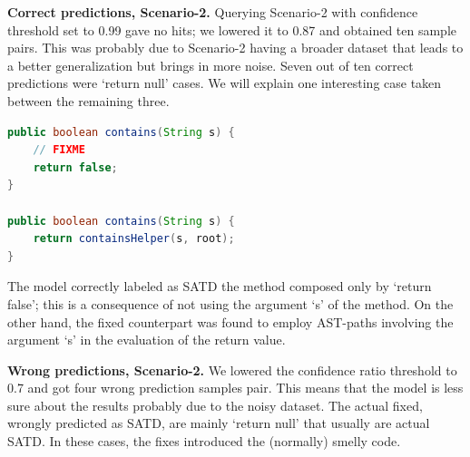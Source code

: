 \textbf{Correct predictions, Scenario-2.}
 Querying Scenario-2 with confidence threshold set to 0.99 gave no hits; we lowered it to 0.87 and obtained ten sample pairs. This was probably due to Scenario-2 having a broader dataset that leads to a better generalization but brings in more noise. 
 Seven out of ten correct predictions were `return null' cases. We will explain one interesting case taken between the remaining three.


\begin{lstlisting}[caption={Scenario-2 correct predictions, verbatim source code}, label={lst:scenario_2_correct},language=Java]
public boolean contains(String s) {
    // FIXME
    return false;
}

public boolean contains(String s) {
    return containsHelper(s, root);
}
\end{lstlisting}

The model correctly labeled as SATD the method composed only by `return false'; this is a consequence of not using the argument `s' of the method. On the other hand, the fixed counterpart was found to employ AST-paths involving the argument `s' in the evaluation of the return value.

\textbf{Wrong predictions, Scenario-2.}
We lowered the confidence ratio threshold to 0.7 and got four wrong prediction samples pair. This means that the model is less sure about the results probably due to the noisy dataset.
The actual fixed, wrongly predicted as SATD, are mainly `return null' that usually are actual SATD. In these cases, the fixes introduced the (normally) smelly code.